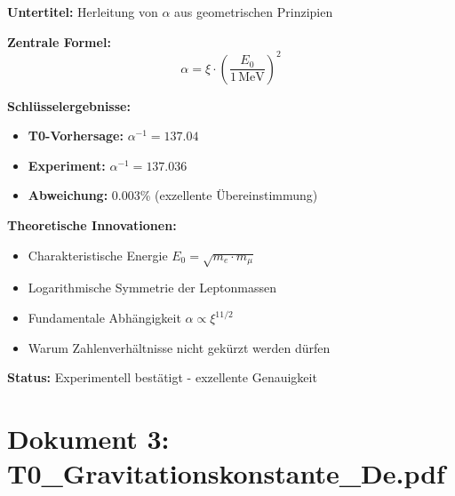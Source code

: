 \documentclass[12pt,a4paper]{article}
\newcommand{\xipar}{\xi}
\begin{document}
	\begin{documentbox}
		\textbf{Untertitel:} Herleitung von $\alpha$ aus geometrischen Prinzipien
		
		\textbf{Zentrale Formel:}
		\begin{equation}
			\boxed{\alpha = \xipar \cdot \left(\frac{E_0}{1\,\text{MeV}}\right)^2}
		\end{equation}
		
		\textbf{Schlüsselergebnisse:}
		\begin{itemize}
			\item \textbf{T0-Vorhersage:} $\alpha^{-1} = 137.04$
			\item \textbf{Experiment:} $\alpha^{-1} = 137.036$
			\item \textbf{Abweichung:} 0.003\% (exzellente Übereinstimmung)
		\end{itemize}
		
		\textbf{Theoretische Innovationen:}
		\begin{itemize}
			\item Charakteristische Energie $E_0 = \sqrt{m_e \cdot m_\mu}$
			\item Logarithmische Symmetrie der Leptonmassen
			\item Fundamentale Abhängigkeit $\alpha \propto \xipar^{11/2}$
			\item Warum Zahlenverhältnisse nicht gekürzt werden dürfen
		\end{itemize}
		
		\textbf{Status:} Experimentell bestätigt - exzellente Genauigkeit
	\end{documentbox}
	
	\section{Dokument 3: T0\_Gravitationskonstante\_De.pdf}
	
\end{document}
